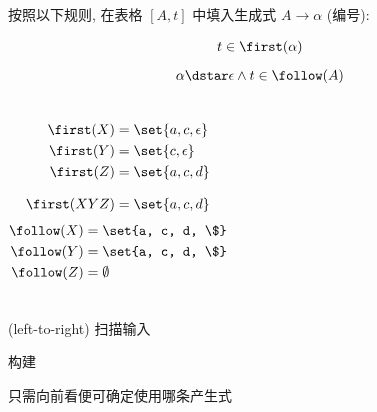 \begin{frame}{}
  \begin{center}

    \vspace{0.80cm}
    按照以下规则, 在表格 $[A, t]$ 中填入生成式 $A \to \alpha$ (编号):

    \setcounter{equation}{0}
    \begin{gather}
      t \in \first(\alpha) \\[6pt]
      \alpha \dstar \epsilon \land t \in \follow(A)
    \end{gather}

    \vspace{0.60cm}
  \end{center}
\end{frame}

\begin{frame}{}
  \begin{columns}
      
      \begin{align*}
        \first(X) &= \set{a, c, \epsilon} \\
        \first(Y) &= \set{c, \epsilon} \\
        \first(Z) &= \set{a, c, d} \\[8pt]
        \first(XYZ) &= \set{a, c, d}
      \end{align*}
      \begin{align*}
        \follow(X) &= \set{a, c, d, \$} \\
        \follow(Y) &= \set{a, c, d, \$} \\
        \follow(Z) &= \emptyset
      \end{align*}
  \end{columns}

  
\end{frame}

\begin{frame}{}
  \begin{center}
    {\large {}}

    \vspace{0.80cm}
    \begin{description}
      \setlength{\itemsep}{12pt}
      \item[$L:$]  (left-to-right) 扫描输入
      \item[$L:$] 构建
      \item[$1:$] 只需向前看便可确定使用哪条产生式
    \end{description}
  \end{center}
\end{frame}

